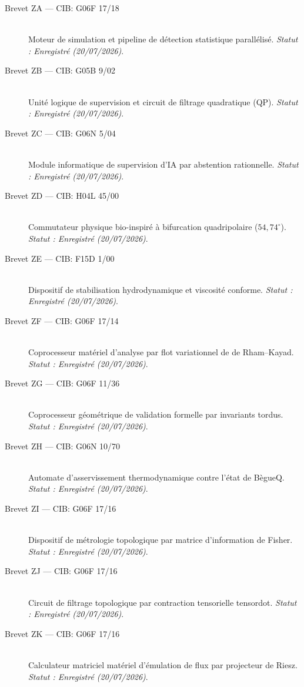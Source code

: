 \begin{description}
    \item[Brevet ZA --- CIB: G06F 17/18] \hfill \\ Moteur de simulation et pipeline de détection statistique parallélisé. \textit{Statut : Enregistré (20/07/2026)}.
    \item[Brevet ZB --- CIB: G05B 9/02] \hfill \\ Unité logique de supervision et circuit de filtrage quadratique (QP). \textit{Statut : Enregistré (20/07/2026)}.
    \item[Brevet ZC --- CIB: G06N 5/04] \hfill \\ Module informatique de supervision d'IA par abstention rationnelle. \textit{Statut : Enregistré (20/07/2026)}.
    \item[Brevet ZD --- CIB: H04L 45/00] \hfill \\ Commutateur physique bio-inspiré à bifurcation quadripolaire ($54,74^\circ$). \textit{Statut : Enregistré (20/07/2026)}.
    \item[Brevet ZE --- CIB: F15D 1/00] \hfill \\ Dispositif de stabilisation hydrodynamique et viscosité conforme. \textit{Statut : Enregistré (20/07/2026)}.
    \item[Brevet ZF --- CIB: G06F 17/14] \hfill \\ Coprocesseur matériel d'analyse par flot variationnel de de Rham–Kayad. \textit{Statut : Enregistré (20/07/2026)}.
    \item[Brevet ZG --- CIB: G06F 11/36] \hfill \\ Coprocesseur géométrique de validation formelle par invariants tordus. \textit{Statut : Enregistré (20/07/2026)}.
    \item[Brevet ZH --- CIB: G06N 10/70] \hfill \\ Automate d'asservissement thermodynamique contre l'état de BègueQ. \textit{Statut : Enregistré (20/07/2026)}.
    \item[Brevet ZI --- CIB: G06F 17/16] \hfill \\ Dispositif de métrologie topologique par matrice d'information de Fisher. \textit{Statut : Enregistré (20/07/2026)}.
    \item[Brevet ZJ --- CIB: G06F 17/16] \hfill \\ Circuit de filtrage topologique par contraction tensorielle tensordot. \textit{Statut : Enregistré (20/07/2026)}.
    \item[Brevet ZK --- CIB: G06F 17/16] \hfill \\ Calculateur matriciel matériel d'émulation de flux par projecteur de Riesz. \textit{Statut : Enregistré (20/07/2026)}.

\end{description}
